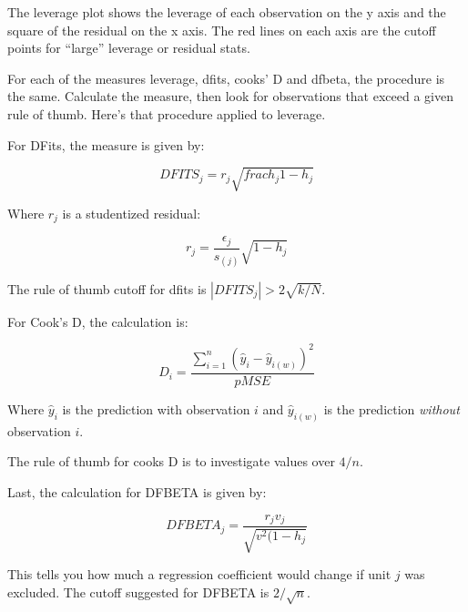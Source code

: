 \documentclass[12pt]{article}
\begin{document}
The leverage plot shows the leverage of each observation on the y axis
and the square of the residual on the x axis. The red lines on each
axis are the cutoff points for ``large'' leverage or residual stats. 

For each of the measures leverage, dfits, cooks' D and dfbeta, the
procedure is the same. Calculate the measure, then look for
observations that exceed a given rule of thumb. Here's that procedure
applied to leverage. 

For DFits, the measure is given by:

\begin{equation*}
  DFITS_j=r_j\sqrt{frac{{h_j}{1-h_j}}}
\end{equation*}

Where $r_j$ is a studentized residual:

\begin{equation*}
  r_j=\frac{\epsilon_j}{s_{(j)}}\sqrt{1-h_j}
\end{equation*}

The rule of thumb cutoff for dfits is $|{DFITS_j}|>2 \sqrt{k/N}$.

For Cook's D, the calculation is:

\begin{equation*}
  D_i=\frac{\sum_{i=1}^n(\hat{y}_i-\hat{y}_{i(w)})^2}{p MSE}
\end{equation*}

Where $\hat{y}_i$ is the prediction with observation $i$ and
$\hat{y}_{i(w)}$ is the prediction \emph{without} observation $i$. 

The rule of thumb for cooks D is to investigate values over $4/n$. 

Last, the calculation for DFBETA is given by: 

\begin{equation*}
  DFBETA_j=\frac{r_jv_j}{\sqrt{v^2(1-h_j}}
\end{equation*}

This tells you how much a regression coefficient would change if unit
$j$ was excluded. The cutoff suggested for DFBETA is $2/\sqrt{n}$. 
\end{document}
